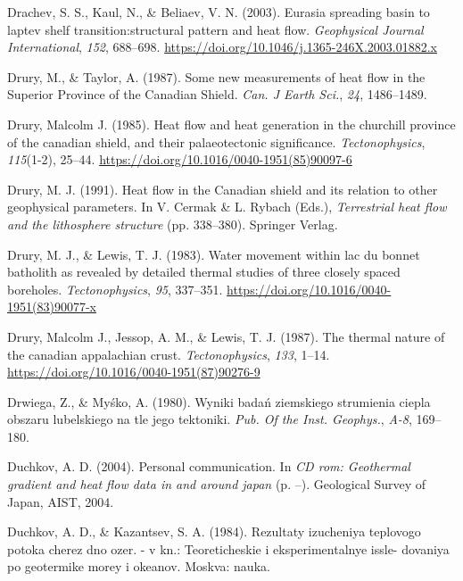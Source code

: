 \documentclass[draft,linenumbers]{agujournal2018}
\begin{document}
\leavevmode{}%
Drachev, S. S., Kaul, N., \& Beliaev, V. N. (2003). Eurasia spreading
basin to laptev shelf transition:structural pattern and heat flow.
\emph{Geophysical Journal International}, \emph{152}, 688--698.
\url{https://doi.org/10.1046/j.1365-246X.2003.01882.x}

\leavevmode{}%
Drury, M., \& Taylor, A. (1987). Some new measurements of heat flow in
the {Superior Province} of the {Canadian Shield}. \emph{Can. J Earth
Sci.}, \emph{24}, 1486--1489.

\leavevmode{}%
Drury, Malcolm J. (1985). Heat flow and heat generation in the churchill
province of the canadian shield, and their palaeotectonic significance.
\emph{Tectonophysics}, \emph{115}(1-2), 25--44.
\url{https://doi.org/10.1016/0040-1951(85)90097-6}

\leavevmode{}%
Drury, M. J. (1991). Heat flow in the {Canadian} shield and its relation
to other geophysical parameters. In V. Cermak \& L. Rybach (Eds.),
\emph{Terrestrial heat flow and the lithosphere structure} (pp.
338--380). Springer Verlag.

\leavevmode{}%
Drury, M. J., \& Lewis, T. J. (1983). Water movement within lac du
bonnet batholith as revealed by detailed thermal studies of three
closely spaced boreholes. \emph{Tectonophysics}, \emph{95}, 337--351.
\url{https://doi.org/10.1016/0040-1951(83)90077-x}

\leavevmode{}%
Drury, Malcolm J., Jessop, A. M., \& Lewis, T. J. (1987). The thermal
nature of the canadian appalachian crust. \emph{Tectonophysics},
\emph{133}, 1--14. \url{https://doi.org/10.1016/0040-1951(87)90276-9}

\leavevmode{}%
Drwiega, Z., \& Myśko, A. (1980). Wyniki bada{ń} ziemskiego strumienia
ciepla obszaru lubelskiego na tle jego tektoniki. \emph{Pub. Of the
Inst. Geophys.}, \emph{A-8}, 169--180.

\leavevmode{}%
Duchkov, A. D. (2004). Personal communication. In \emph{CD rom:
Geothermal gradient and heat flow data in and around japan} (p. --).
Geological Survey of Japan, AIST, 2004.

\leavevmode{}%
Duchkov, A. D., \& Kazantsev, S. A. (1984). Rezultaty izucheniya
teplovogo potoka cherez dno ozer. - v kn.: Teoreticheskie i
eksperimentalnye issle- dovaniya po geotermike morey i okeanov. Moskva:
nauka.
\end{document}
